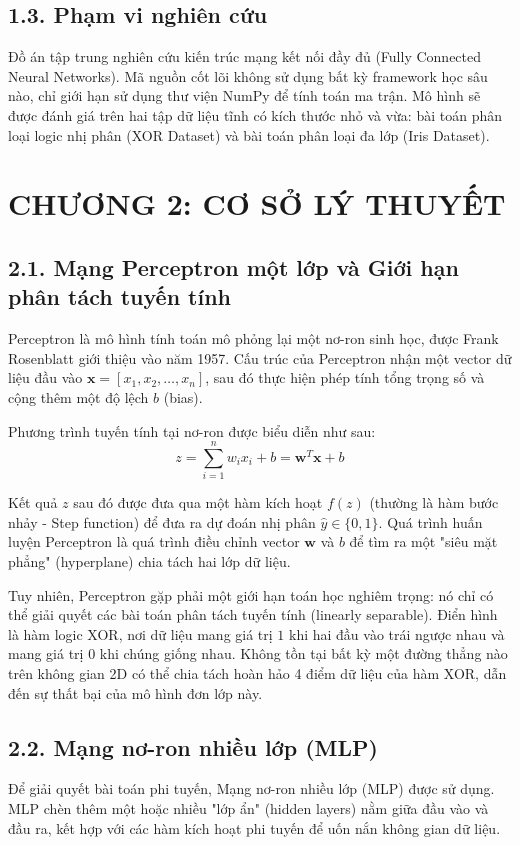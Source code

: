 \documentclass[13pt,a4paper]{article}
\begin{document}
\subsection*{1.3. Phạm vi nghiên cứu}
Đồ án tập trung nghiên cứu kiến trúc mạng kết nối đầy đủ (Fully Connected Neural Networks). Mã nguồn cốt lõi không sử dụng bất kỳ framework học sâu nào, chỉ giới hạn sử dụng thư viện NumPy để tính toán ma trận. Mô hình sẽ được đánh giá trên hai tập dữ liệu tĩnh có kích thước nhỏ và vừa: bài toán phân loại logic nhị phân (XOR Dataset) và bài toán phân loại đa lớp (Iris Dataset).

\section*{CHƯƠNG 2: CƠ SỞ LÝ THUYẾT}
\subsection*{2.1. Mạng Perceptron một lớp và Giới hạn phân tách tuyến tính}
Perceptron là mô hình tính toán mô phỏng lại một nơ-ron sinh học, được Frank Rosenblatt giới thiệu vào năm 1957. Cấu trúc của Perceptron nhận một vector dữ liệu đầu vào $\mathbf{x} = [x_1, x_2, \dots, x_n]$, sau đó thực hiện phép tính tổng trọng số và cộng thêm một độ lệch $b$ (bias).

Phương trình tuyến tính tại nơ-ron được biểu diễn như sau:
\[
z = \sum_{i=1}^{n} w_i x_i + b = \mathbf{w}^T \mathbf{x} + b
\]

Kết quả $z$ sau đó được đưa qua một hàm kích hoạt $f(z)$ (thường là hàm bước nhảy - Step function) để đưa ra dự đoán nhị phân $\hat{y} \in \{0, 1\}$. Quá trình huấn luyện Perceptron là quá trình điều chỉnh vector $\mathbf{w}$ và $b$ để tìm ra một "siêu mặt phẳng" (hyperplane) chia tách hai lớp dữ liệu.

Tuy nhiên, Perceptron gặp phải một giới hạn toán học nghiêm trọng: nó chỉ có thể giải quyết các bài toán phân tách tuyến tính (linearly separable). Điển hình là hàm logic XOR, nơi dữ liệu mang giá trị $1$ khi hai đầu vào trái ngược nhau và mang giá trị $0$ khi chúng giống nhau. Không tồn tại bất kỳ một đường thẳng nào trên không gian 2D có thể chia tách hoàn hảo 4 điểm dữ liệu của hàm XOR, dẫn đến sự thất bại của mô hình đơn lớp này.

\subsection*{2.2. Mạng nơ-ron nhiều lớp (MLP)}
Để giải quyết bài toán phi tuyến, Mạng nơ-ron nhiều lớp (MLP) được sử dụng. MLP chèn thêm một hoặc nhiều "lớp ẩn" (hidden layers) nằm giữa đầu vào và đầu ra, kết hợp với các hàm kích hoạt phi tuyến để uốn nắn không gian dữ liệu.
\end{document}
